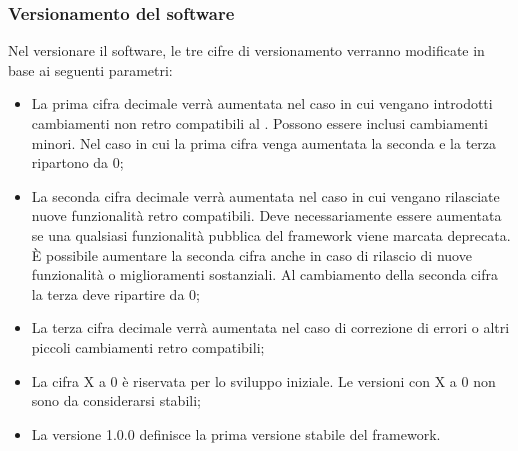 \subsubsection{Versionamento del software}
\label{6.2}
Nel versionare il software, le tre cifre di versionamento verranno modificate in base ai seguenti parametri:
\begin{itemize}
\item La prima cifra decimale verrà aumentata nel caso in cui vengano introdotti cambiamenti non retro compatibili al . Possono essere inclusi cambiamenti minori. Nel caso in cui la prima cifra venga aumentata la seconda e la terza ripartono da 0;
\item La seconda cifra decimale verrà aumentata nel caso in cui vengano rilasciate nuove funzionalità retro compatibili. Deve necessariamente essere aumentata se una qualsiasi funzionalità pubblica del framework viene marcata deprecata. È possibile aumentare la seconda cifra anche in caso di rilascio di nuove funzionalità o miglioramenti sostanziali. Al cambiamento della seconda cifra la terza deve ripartire da 0;
\item La terza cifra decimale verrà aumentata nel caso di correzione di errori o altri piccoli cambiamenti retro compatibili;
\item La cifra X a 0 è riservata per lo sviluppo iniziale. Le versioni con X a 0 non sono da considerarsi stabili;
\item La versione 1.0.0 definisce la prima versione stabile del framework.
\end{itemize}

